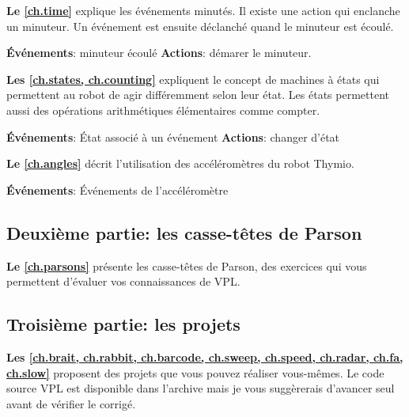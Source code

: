  \quad {} \hfill {}
\quad {} \quad {}

\medskip


\medskip

\textbf{Le \cref{ch.time}} explique les événements minutés.
Il existe une action qui enclanche un minuteur.
Un événement est ensuite déclanché quand le minuteur est écoulé.

\textbf{Événements}: minuteur écoulé\hfill
\textbf{Actions}: démarer le minuteur.

 \hfill {}

\newpage

\textbf{Les \cref{ch.states, ch.counting}} expliquent le concept de machines à états qui permettent au robot de agir différemment selon leur état.
Les états permettent aussi des opérations arithmétiques élémentaires comme compter.

\textbf{Événements}: État associé à un événement\hfill
\textbf{Actions}: changer d'état

 \hfill {}

\medskip

\textbf{Le \cref{ch.angles}} décrit l'utilisation des accéléromètres du robot Thymio.

\textbf{Événements}: Événements de l'accéléromètre

 \quad {}

\bigskip

\subsection*{Deuxième partie: les casse-têtes de Parson}

\textbf{Le \cref{ch.parsons}} présente les casse-têtes de Parson, des exercices qui vous permettent d'évaluer vos connaissances de VPL.

\bigskip

\subsection*{Troisième partie: les projets}
\textbf{Les \cref{ch.brait, ch.rabbit, ch.barcode, ch.sweep, ch.speed, ch.radar, ch.fa, ch.slow}} proposent des projets que vous pouvez réaliser vous-mêmes.
Le code source VPL est disponible dans l'archive mais je vous suggèrerais d'avancer seul avant de vérifier le corrigé.


